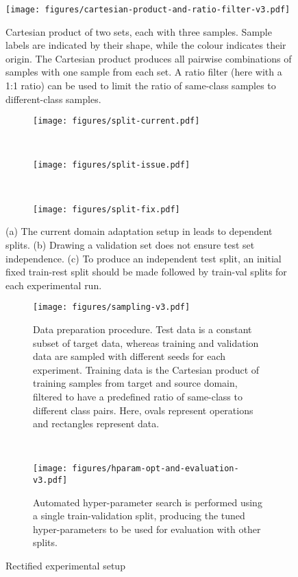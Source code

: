 \documentclass[journal]{IEEEtran}
\begin{document}
\begin{figure}[t]
    \centering
    \texttt{[image: figures/cartesian-product-and-ratio-filter-v3.pdf]}
    \caption{Cartesian product of two sets, each with three samples. Sample labels are indicated by their shape, while the colour indicates their origin. The Cartesian product produces all pairwise combinations of samples with one sample from each set. A ratio filter (here with a 1:1 ratio) can be used to limit the ratio of same-class samples to different-class samples.}
    \label{fig:cartesian}
\end{figure}

\begin{figure}
    \centering
    \begin{subfigure}[b]{0.3\linewidth}
        \texttt{[image: figures/split-current.pdf]}
		\caption{}
		\label{fig:no-val}
	\end{subfigure}
	\ \ \ 
    \begin{subfigure}[b]{0.3\linewidth}
        \texttt{[image: figures/split-issue.pdf]}
        \caption{}
		\label{fig:bad-val}
	\end{subfigure}
	\ \ \ 
	\begin{subfigure}[b]{0.3\linewidth}
	    \texttt{[image: figures/split-fix.pdf]}
	    \caption{}
		\label{fig:good-val}
	\end{subfigure}
    \caption{(a) The current domain adaptation setup in \cite{motiian2017ccsa, xu2019dsne} leads to dependent splits. (b) Drawing a validation set does not ensure test set independence. (c) To produce an independent test split, an initial fixed train-rest split should be made followed by train-val splits for each experimental run. }
    \label{fig:split-issues}
\end{figure}

\begin{figure*}
    \centering
    \begin{subfigure}[b]{0.65\linewidth}
        \texttt{[image: figures/sampling-v3.pdf]}
        \caption{Data preparation procedure. Test data is a constant subset of target data, whereas training and validation data are sampled with different seeds for each experiment. Training data is the Cartesian product of training samples from target and source domain, filtered to have a predefined ratio of same-class to different class pairs. Here, ovals represent operations and rectangles represent data.}
        \label{fig:data-prep}
	\end{subfigure}
	\ \ \ \ \ \ \
	\begin{subfigure}[b]{0.27\linewidth}
	    \texttt{[image: figures/hparam-opt-and-evaluation-v3.pdf]}
	    \caption{Automated hyper-parameter search is performed using a single train-validation split, producing the tuned hyper-parameters to be used for evaluation with other splits.}
		\label{fig:hparam-and-eval}
	\end{subfigure}
	\caption{Rectified experimental setup}
\end{figure*}
\end{document}
